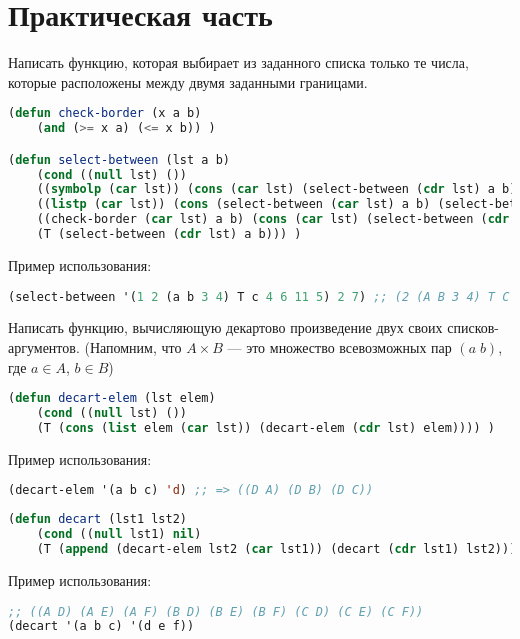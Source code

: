 \documentclass[a4paper,oneside,12pt]{extreport}
\begin{document}


\section*{Практическая часть}

\begin{task}
    Написать функцию, которая выбирает из заданного списка только
    те числа, которые расположены между двумя заданными границами.

    \begin{lstlisting}[language=Lisp]
(defun check-border (x a b)
    (and (>= x a) (<= x b)) )

(defun select-between (lst a b)
    (cond ((null lst) ())
    ((symbolp (car lst)) (cons (car lst) (select-between (cdr lst) a b)))
    ((listp (car lst)) (cons (select-between (car lst) a b) (select-between (cdr lst) a b)))
    ((check-border (car lst) a b) (cons (car lst) (select-between (cdr lst) a b)))
    (T (select-between (cdr lst) a b))) )
    \end{lstlisting}

    Пример использования:
    \begin{lstlisting}[language=Lisp] 
(select-between '(1 2 (a b 3 4) T c 4 6 11 5) 2 7) ;; (2 (A B 3 4) T C 4 6 5)
    \end{lstlisting}
\end{task}

\begin{task}
	Написать функцию, вычисляющую декартово произведение двух своих списков-аргументов.
	(Напомним, что $A\times B$ — это множество всевозможных пар $(a\;b)$, где $a\in A$, $b\in B$)

    \begin{lstlisting}[language=Lisp]
(defun decart-elem (lst elem)
	(cond ((null lst) ())
	(T (cons (list elem (car lst)) (decart-elem (cdr lst) elem)))) )
    \end{lstlisting}


    Пример использования:
    \begin{lstlisting}[language=Lisp]    
(decart-elem '(a b c) 'd) ;; => ((D A) (D B) (D C))
    \end{lstlisting}

    \begin{lstlisting}[language=Lisp]
(defun decart (lst1 lst2)
	(cond ((null lst1) nil)
	(T (append (decart-elem lst2 (car lst1)) (decart (cdr lst1) lst2)))) )
    \end{lstlisting}

    Пример использования:
    \begin{lstlisting}[language=Lisp]   
;; ((A D) (A E) (A F) (B D) (B E) (B F) (C D) (C E) (C F))
(decart '(a b c) '(d e f))  
    \end{lstlisting}
\end{task}
\end{document}
